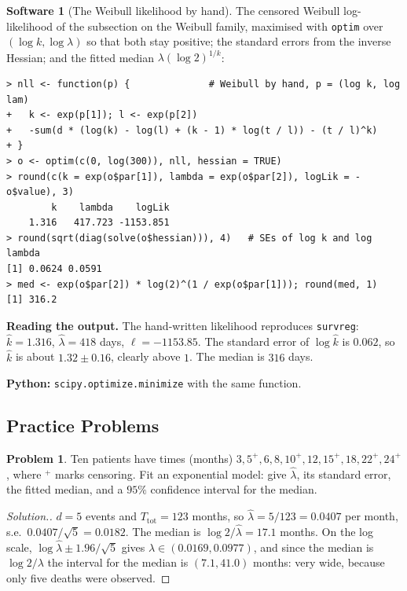 \documentclass[11pt,a4paper]{article}
\numberwithin{equation}{section}
\theoremstyle{definition}
\newtheorem{software}[thm]{Software}
\newtheorem{problemx}{Problem}[subsection]
\newenvironment{problem}{\begin{problemx}}{\end{problemx}}
\newenvironment{solution}
  {\renewcommand{\qedsymbol}{}\begin{proof}[\textit{Solution}.]}
  {\end{proof}}
\begin{document}
\begin{software}[The Weibull likelihood by hand]
\label{sw:weibullfit}
The censored Weibull log-likelihood of the subsection on the Weibull family, maximised with \texttt{optim} over $(\log k, \log\lambda)$ so that both stay positive; the standard errors from the inverse Hessian; and the fitted median $\lambda(\log 2)^{1/k}$:
{\small\begin{verbatim}
> nll <- function(p) {              # Weibull by hand, p = (log k, log lam)
+   k <- exp(p[1]); l <- exp(p[2])
+   -sum(d * (log(k) - log(l) + (k - 1) * log(t / l)) - (t / l)^k)
+ }
> o <- optim(c(0, log(300)), nll, hessian = TRUE)
> round(c(k = exp(o$par[1]), lambda = exp(o$par[2]), logLik = -o$value), 3)
        k    lambda    logLik 
    1.316   417.723 -1153.851 
> round(sqrt(diag(solve(o$hessian))), 4)   # SEs of log k and log lambda
[1] 0.0624 0.0591
> med <- exp(o$par[2]) * log(2)^(1 / exp(o$par[1])); round(med, 1)
[1] 316.2
\end{verbatim}}
\textbf{Reading the output.} The hand-written likelihood reproduces \texttt{survreg}: $\hat k = 1.316$, $\hat\lambda = 418$ days, $\ell = -1153.85$. The standard error of $\log\hat k$ is $0.062$, so $\hat k$ is about $1.32 \pm 0.16$, clearly above $1$. The median is $316$ days.

\textbf{Python:} \texttt{scipy.optimize.minimize} with the same function.
\end{software}

\subsection{Practice Problems}

\begin{problem}
Ten patients have times (months) $3, 5^+, 6, 8, 10^+, 12, 15^+, 18, 22^+, 24^+$, where $^+$ marks censoring. Fit an exponential model: give $\hat\lambda$, its standard error, the fitted median, and a $95\%$ confidence interval for the median.
\end{problem}

\begin{solution}
$d = 5$ events and $T_{\mathrm{tot}} = 123$ months, so $\hat\lambda = 5/123 = 0.0407$ per month, s.e.\ $0.0407/\sqrt5 = 0.0182$. The median is $\log 2/\hat\lambda = 17.1$ months. On the log scale, $\log\hat\lambda \pm 1.96/\sqrt5$ gives $\lambda \in (0.0169, 0.0977)$, and since the median is $\log 2/\lambda$ the interval for the
median is $(7.1, 41.0)$ months: very wide, because only five deaths were observed.
\end{solution}
\end{document}
